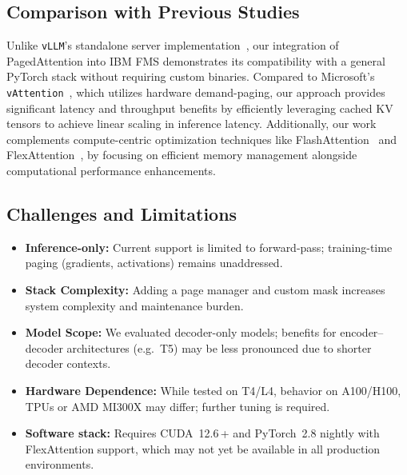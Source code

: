 \documentclass[conference]{IEEEtran}
\begin{document}
\subsection{Comparison with Previous Studies}\label{ssec:comparison_prev}
Unlike \texttt{vLLM}'s standalone server implementation~\cite{kwon2023pagedattention}, our integration of PagedAttention into IBM FMS demonstrates its compatibility with a general PyTorch stack without requiring custom binaries. Compared to Microsoft's \texttt{vAttention}~\cite{prabhu2024vattention}, which utilizes hardware demand-paging, our approach provides significant latency and throughput benefits by efficiently leveraging cached KV tensors to achieve linear scaling in inference latency. Additionally, our work complements compute-centric optimization techniques like FlashAttention~\cite{dao2022flashattention} and FlexAttention~\cite{pytorch2023flexattention}, by focusing on efficient memory management alongside computational performance enhancements.


\subsection{Challenges and Limitations}\label{ssec:limitations}
\begin{itemize}
  \item \textbf{Inference-only:} Current support is limited to forward-pass; training-time paging (gradients, activations) remains unaddressed.
  \item \textbf{Stack Complexity:} Adding a page manager and custom mask increases system complexity and maintenance burden.
  \item \textbf{Model Scope:} We evaluated decoder-only models; benefits for encoder–decoder architectures (e.g.\ T5) may be less pronounced due to shorter decoder contexts.
  \item \textbf{Hardware Dependence:} While tested on T4/L4, behavior on A100/H100, TPUs or AMD MI300X may differ; further tuning is required.
  \item \textbf{Software stack:} Requires CUDA 12.6 + and PyTorch 2.8 nightly with FlexAttention support, which may not yet be available in all production environments.
\end{itemize}
\end{document}
